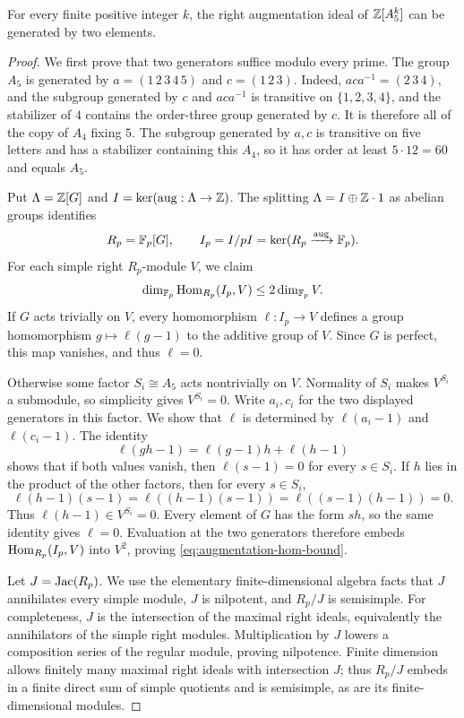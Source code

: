 \begin{lemma}\label{lem:augmentation}
For every finite positive integer $k$, the right augmentation ideal of
$\mathbb Z[A_5^k]$ can be generated by two elements.
\end{lemma}

\begin{proof}
We first prove that two generators suffice modulo every prime.
The group $A_5$ is generated by
$a=(1\,2\,3\,4\,5)$ and $c=(1\,2\,3)$.
Indeed, $aca^{-1}=(2\,3\,4)$, and the subgroup generated by
$c$ and $aca^{-1}$ is transitive on $\{1,2,3,4\}$, and the
stabilizer of $4$ contains the order-three group generated by $c$. It is therefore all of the copy
of $A_4$ fixing $5$. The subgroup generated by $a,c$ is transitive
on five letters and has a stabilizer containing this $A_4$, so it
has order at least $5\cdot12=60$ and equals $A_5$.

Put $\Lambda=\mathbb Z[G]$ and $I=\ker(\operatorname{aug}:\Lambda\to\mathbb Z)$.
The splitting $\Lambda=I\oplus\mathbb Z\cdot1$ as abelian groups identifies
\[
 R_p=\mathbb F_p[G],\qquad I_p=I/pI=\ker(R_p\xrightarrow{\operatorname{aug}}\mathbb F_p).
\]
For each simple right $R_p$-module $V$, we claim
\begin{equation}\label{eq:augmentation-hom-bound}
 \dim_{\mathbb F_p}\operatorname{Hom}_{R_p}(I_p,V)\le 2\dim_{\mathbb F_p}V.
\end{equation}
If $G$ acts trivially on $V$, every homomorphism $\ell:I_p\to V$
defines a group homomorphism $g\mapsto\ell(g-1)$ to the additive
group of $V$. Since $G$ is perfect, this map vanishes, and thus
$\ell=0$.

Otherwise some factor $S_i\cong A_5$ acts nontrivially on $V$.
Normality of $S_i$ makes $V^{S_i}$ a submodule, so simplicity gives
$V^{S_i}=0$. Write $a_i,c_i$ for the two displayed generators in this
factor. We show that $\ell$ is determined by
$\ell(a_i-1)$ and $\ell(c_i-1)$. The identity
\[
 \ell(gh-1)=\ell(g-1)h+\ell(h-1)
\]
shows that if both values vanish, then $\ell(s-1)=0$ for every
$s\in S_i$. If $h$ lies in the product of the other factors, then
for every $s\in S_i$,
\[
 \ell(h-1)(s-1)
 =\ell((h-1)(s-1))
 =\ell((s-1)(h-1))=0.
\]
Thus $\ell(h-1)\in V^{S_i}=0$. Every element of $G$ has the form
$sh$, so the same identity gives $\ell=0$. Evaluation at the two
generators therefore embeds $\operatorname{Hom}_{R_p}(I_p,V)$ into $V^2$, proving
\eqref{eq:augmentation-hom-bound}.

Let $J=\operatorname{Jac}(R_p)$. We use the elementary finite-dimensional algebra
facts that $J$ annihilates every simple module, $J$ is nilpotent,
and $R_p/J$ is semisimple. For completeness, $J$ is the intersection
of the maximal right ideals, equivalently the annihilators of the
simple right modules. Multiplication by $J$ lowers a composition
series of the regular module, proving nilpotence. Finite dimension
allows finitely many maximal right ideals with intersection $J$;
thus $R_p/J$ embeds in a finite direct sum of simple quotients and is
semisimple, as are its finite-dimensional modules.


\end{proof}
